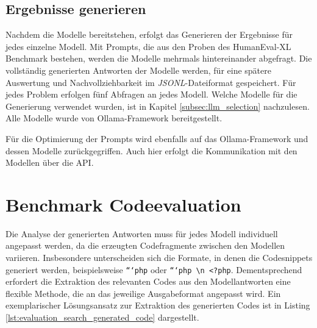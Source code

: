 

\subsection{Ergebnisse generieren}
Nachdem die Modelle bereitstehen, erfolgt das Generieren der Ergebnisse für jedes einzelne Modell. Mit Prompts, die aus den Proben des HumanEval-XL Benchmark bestehen, werden die Modelle mehrmals hintereinander abgefragt. Die vollständig generierten Antworten der Modelle werden, für eine spätere Auswertung und Nachvollziehbarkeit im \textit{JSONL}-Dateiformat gespeichert. Für jedes Problem erfolgen fünf Abfragen an jedes Modell. Welche Modelle für die Generierung verwendet wurden, ist in Kapitel \ref{subsec:llm_selection} nachzulesen. Alle Modelle wurde von Ollama-Framework bereitgestellt.\vspace{0.2cm}

Für die Optimierung der Prompts wird ebenfalls auf das Ollama-Framework und dessen Modelle zurückgegriffen. Auch hier erfolgt die Kommunikation mit den Modellen über die API.



\section{Benchmark Codeevaluation}\label{sec:benchmark_evaluation}
Die Analyse der generierten Antworten muss für jedes Modell individuell angepasst werden, da die erzeugten Codefragmente zwischen den Modellen variieren. Insbesondere unterscheiden sich die Formate, in denen die Codesnippets generiert werden, beispielsweise \texttt{```php} oder \texttt{```php \textbackslash n <?php}. Dementsprechend erfordert die Extraktion des relevanten Codes aus den Modellantworten eine flexible Methode, die an das jeweilige Ausgabeformat angepasst wird. Ein exemplarischer Lösungsansatz zur Extraktion des generierten Codes ist in Listing \ref{lst:evaluation_search_generated_code} dargestellt.\vspace{0.2cm}



